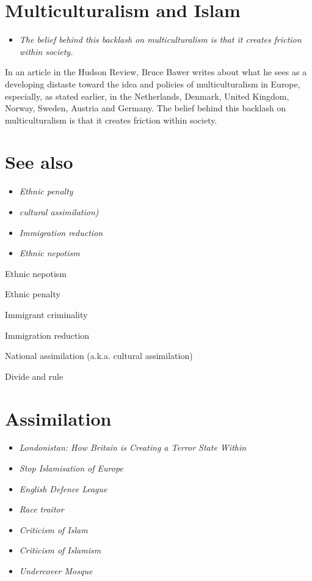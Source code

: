 \section{Multiculturalism and Islam}\label{multiculturalism-and-islam}

\begin{itemize}
\item
  \emph{The belief behind this backlash on multiculturalism is that it
  creates friction within society.}
\end{itemize}

In an article in the Hudson Review, Bruce Bawer writes about what he
sees as a developing distaste toward the idea and policies of
multiculturalism in Europe, especially, as stated earlier, in the
Netherlands, Denmark, United Kingdom, Norway, Sweden, Austria and
Germany. The belief behind this backlash on multiculturalism is that it
creates friction within society.

\section{See also}\label{see-also}

\begin{itemize}
\item
  \emph{Ethnic penalty}
\item
  \emph{cultural assimilation)}
\item
  \emph{Immigration reduction}
\item
  \emph{Ethnic nepotism}
\end{itemize}

Ethnic nepotism

Ethnic penalty

Immigrant criminality

Immigration reduction

National assimilation (a.k.a. cultural assimilation)

Divide and rule

\section{Assimilation}\label{assimilation}

\begin{itemize}
\item
  \emph{Londonistan: How Britain is Creating a Terror State Within}
\item
  \emph{Stop Islamisation of Europe}
\item
  \emph{English Defence League}
\item
  \emph{Race traitor}
\item
  \emph{Criticism of Islam}
\item
  \emph{Criticism of Islamism}
\item
  \emph{Undercover Mosque}
\end{itemize}

